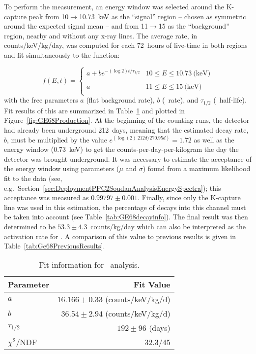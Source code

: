 	To perform the measurement, an energy window was selected around the K-capture peak from 10$\to$10.73~keV as the ``signal'' region -- chosen as symmetric around the expected signal mean -- and from 11$\to$15 as the ``background'' region, nearby and without any x-ray lines.  The average rate, in counts/keV/kg/day, was computed for each 72~hours of live-time in both regions and fit simultaneously to the function:
	
			\begin{equation}
				f(E,t) = \left\{ 
				\begin{array}{lr} 
 					a + b e^{-\left( \log{2} \right) t/\tau_{1/2}} & 10 \leq E \leq 10.73~\textrm{(keV)}\\
					\\
					a & 11 \leq E \leq 15~\textrm{(keV)}\\
				\end{array} \right.			
			\end{equation}
with the free parameters $a$ (flat background rate), $b$ (\gersixeight~rate), and $\tau_{1/2}$ (\gersixeight~half-life).  Fit results of this are summarized in Table~\ref{tab:Ge68FitResults} and plotted in Figure~\ref{fig:GE68Production}.  At the beginning of the counting runs, the detector had already been underground 212~days, meaning that the estimated decay rate, $b$, must be multiplied by the value $e^{(\log(2)~212 d/270.95 d)} = 1.72$ as well as  the energy window (0.73~keV) to get the counts-per-day-per-kilogram the day the detector was brought underground.  It was necessary to estimate the acceptance of the energy window using parameters ($\mu$ and $\sigma$) found from a maximum likelihood fit to the data (see, e.g.~Section~\ref{sec:DeploymentPPC2SoudanAnalysisEnergySpectra}); this acceptance was measured as $0.99797\pm0.001$.  Finally, since only the K-capture line was used in this estimation, the percentage of decays into this channel must be taken into account (see Table~\ref{tab:GE68decayinfo}).  The final result was then determined to be $53.3\pm4.3$~counts/kg/day which can also be interpreted as the activation rate for \gersixeight.  A comparison of this value to previous results is given in Table~\ref{tab:Ge68PreviousResults}.

       			\begin{table}
				\centering
				\begin{tabular}{l|r}
					\hline
					Parameter & Fit Value \\
					\hline
					$a$ & $16.166\pm0.33$ (counts/keV/kg/d)  \\
					$b$ & $36.54\pm2.94$ (counts/keV/kg/d)  \\
					$\tau_{1/2}$ & $192\pm96$ (days) \\
					$\chi^{2}$/NDF & 32.3/45 \\					
					\hline
				\end{tabular}
				\caption[Fit information for \gersixeight~analysis]
				{Fit information for \gersixeight~analysis.}
				\label{tab:Ge68FitResults}	
			\end{table}	
			
